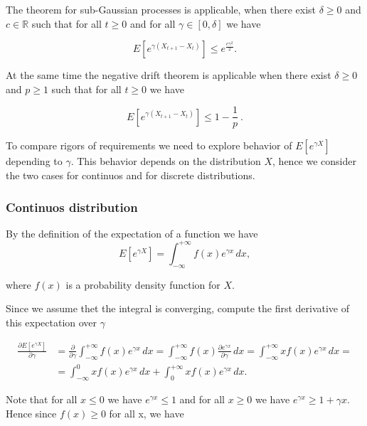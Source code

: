 \documentclass[12pt, a4paper]{article}
\theoremstyle{remark}
\begin{document}


The theorem for sub-Gaussian processes is applicable, when there exist $\delta \geq 0$ and $c \in \mathbb{R}$ such that for all $t \geq 0$ and for all $\gamma \in [0, \delta]$ we have

$$  E\left[e^{\gamma (X_{t + 1} - X_{t})}\right] \leq e^{\frac{c \gamma^2}{2}}.$$

At the same time the negative drift theorem is applicable when there exist $\delta \geq 0$ and $p \geq 1$ such that for all $t \geq 0$ we have

$$
    E\left[e^{\gamma (X_{t + 1} - X_{t})}\right] \leq 1 - \frac{1}{p}\ .$$

To compare rigors of requirements we need to explore behavior of $E[e^{\gamma X}]$ depending to $\gamma$. This behavior depends on the distribution $X$, hence we consider the two cases for continuos and for discrete distributions.

\subsubsection*{Continuos distribution}

By the definition of the expectation of a function we have
\[
    E[e^{\gamma X}] = \int_{-\infty}^{+\infty} f(x) e^{\gamma x} \,dx,
\]

where $f(x)$ is a probability density function for $X$.

\hfill

Since we assume thet the integral is converging, compute the first derivative of this expectation over $\gamma$

\begin{align*}
    \frac{\partial E[e^{\gamma X}]}{\partial \gamma} & = \frac{\partial}{\partial \gamma} \int_{-\infty}^{+\infty} f(x) e^{\gamma x} \, dx = \int_{-\infty}^{+\infty} f(x) \frac{\partial e^{\gamma x}}{\partial \gamma} \, dx = \int_{-\infty}^{+\infty} x f(x) e^{\gamma x} \, dx = \\
    & = \int_{-\infty}^{0} x f(x) e^{\gamma x} \, dx + \int_{0}^{+\infty} x f(x) e^{\gamma x} \, dx.
\end{align*}

Note that for all $x \leq 0$ we have $e^{\gamma x} \leq 1$ and for all $x \geq 0$ we have $e^{\gamma x} \geq 1 + \gamma x$. Hence since $f(x) \geq 0$ for all x, we have
\end{document}
